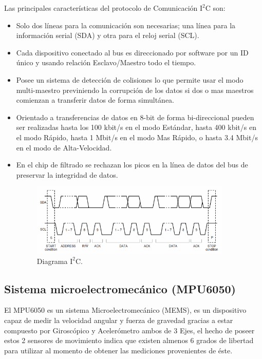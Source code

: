 \documentclass[12pt,a4paper]{article}
\begin{document}
Las principales características del protocolo de Comunicación $\mathrm{I^2C}$ \cite{I2C} son:
\begin{itemize}
\item Solo dos líneas para la comunicación son necesarias; una línea para la información serial (SDA) y otra para el reloj serial (SCL).

\item Cada dispositivo conectado al bus es direccionado por software por un ID único y usando relación Esclavo/Maestro todo el tiempo.

\item Posee un sistema de detección de colisiones lo que permite usar el modo multi-maestro previniendo la corrupción de los datos si dos o mas maestros comienzan a transferir datos de forma simultánea.

\item Orientado a transferencias de datos en 8-bit de forma bi-direccional pueden ser realizadas hasta los 100 kbit/s en el modo Estándar, hasta 400 kbit/s en el modo Rápido, hasta 1 Mbit/s en el modo Mas Rápido, o hasta 3.4 Mbit/s en el modo de Alta-Velocidad.

\item En el chip de filtrado se rechazan los picos en la línea de datos del bus de preservar la integridad de datos.

\begin{figure}[H]
	\centering
  	\includegraphics[width=0.9\textwidth]{images/Diagrama_I2C}
    \caption{Diagrama $\mathrm{I^2C.}$}
	\label{fig:diagramaI2C}
\end{figure}
\end{itemize}

\subsection{Sistema microelectromecánico (MPU6050)}
El MPU6050\cite{MPU6050} es un sistema Microelectromecánico (MEMS), es un dispositivo capaz de medir la velocidad angular y fuerza de gravedad gracias a estar compuesto por Giroscópico y Acelerómetro ambos de 3 Ejes, el hecho de poseer estos 2 sensores de movimiento indica que existen almenos 6 grados de libertad para utilizar al momento de obtener las mediciones provenientes de éste.
   
\end{document}
